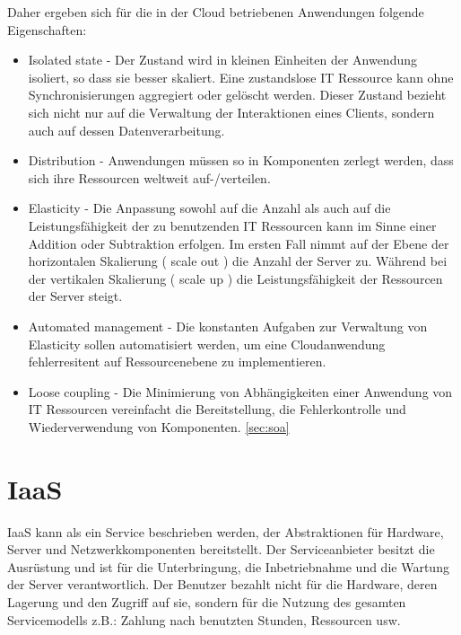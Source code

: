 \documentclass[
12pt,
english,
ngerman,
headsepline,
twoside,
openright,
numbers=noenddot,version=first
]{scrreprt}
\begin{document}
Daher ergeben sich für die in der Cloud betriebenen Anwendungen folgende Eigenschaften: 
\begin{itemize}
	\item Isolated state - Der Zustand wird in kleinen Einheiten der Anwendung isoliert, so dass sie besser skaliert. Eine zustandslose IT Ressource kann ohne Synchronisierungen aggregiert oder gelöscht werden. Dieser Zustand bezieht sich nicht nur auf die Verwaltung der Interaktionen eines Clients, sondern auch auf dessen Datenverarbeitung. 
	\item Distribution - Anwendungen müssen so in Komponenten zerlegt werden, dass sich ihre Ressourcen weltweit auf-/verteilen.
	\item Elasticity\label{app-char:elascitity} - Die Anpassung sowohl auf die Anzahl als auch auf die Leistungsfähigkeit der zu benutzenden IT Ressourcen kann im Sinne einer Addition oder Subtraktion erfolgen. Im ersten Fall nimmt auf der Ebene der horizontalen Skalierung ( scale out ) die Anzahl der Server zu. Während bei der vertikalen Skalierung ( scale up ) die Leistungsfähigkeit der Ressourcen der Server steigt.
	\item Automated management - Die konstanten Aufgaben zur Verwaltung von Elasticity sollen automatisiert werden, um eine Cloudanwendung fehlerresitent auf Ressourcenebene zu implementieren.
	\item Loose coupling - Die Minimierung von Abhängigkeiten einer Anwendung von IT Ressourcen vereinfacht die Bereitstellung, die Fehlerkontrolle und Wiederverwendung von Komponenten. \ref{sec:soa} \cite{cloudEssentials}
\end{itemize}


\section{IaaS}
\label{sec:iaas}
\acrfull{IaaS} kann als ein Service beschrieben werden, der Abstraktionen für Hardware, Server und Netzwerkkomponenten bereitstellt. Der Serviceanbieter besitzt die Ausrüstung und ist für die Unterbringung, die Inbetriebnahme und die Wartung der Server verantwortlich\cite{patternAWS}. Der Benutzer bezahlt nicht für die Hardware, deren Lagerung und den Zugriff auf sie, sondern für die Nutzung des gesamten Servicemodells z.B.: Zahlung nach benutzten Stunden, Ressourcen usw.
\end{document}
